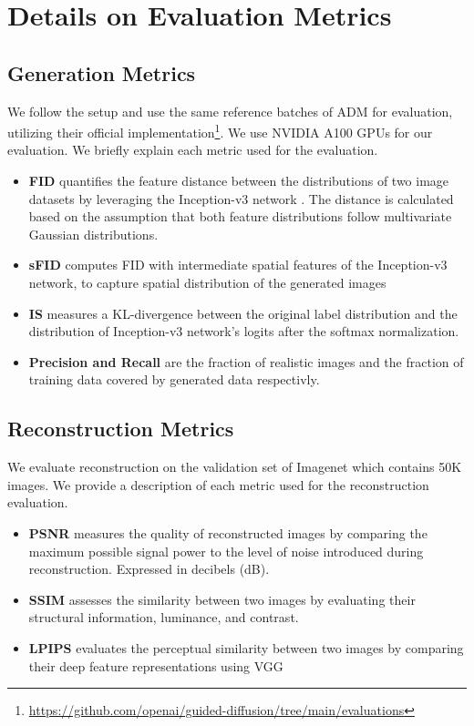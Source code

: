 \section{Details on Evaluation Metrics}
\label{sec:appendix_metrics}

\subsection{Generation Metrics}
We follow the setup and use the same reference batches of ADM \cite{nichol21a}
for evaluation, utilizing their official implementation\footnote{\url{https://github.com/openai/guided-diffusion/tree/main/evaluations}}. We use NVIDIA A100 GPUs for our evaluation.
 We briefly explain each metric used for the evaluation.

 \begin{itemize}
     \item \textbf{FID} \cite{fid} quantifies the feature distance between the distributions of two image datasets by leveraging the Inception-v3 network \cite{szegedy2016rethinking}. The distance is calculated based on the assumption that both feature distributions follow multivariate Gaussian distributions.
     \item \textbf{sFID} \cite{sfid} computes FID with intermediate spatial features of the
        Inception-v3 network, to capture spatial distribution of the generated images
     \item \textbf{IS} \cite{is}  measures a KL-divergence between the original label distribution and the
distribution of Inception-v3 network's logits after the softmax normalization.
\item \textbf{Precision and Recall} \cite{kynkaanniemi2019improved} are the
fraction of realistic images and the fraction of training data covered by generated data respectivly.
 \end{itemize}

\clearpage

\subsection{Reconstruction Metrics}
We evaluate reconstruction on the validation set of Imagenet which contains 50K images. We provide a description of each metric used for the reconstruction evaluation.

 \begin{itemize}
     \item \textbf{PSNR} measures the quality of reconstructed images by comparing the maximum possible signal power to the level of noise introduced during reconstruction. Expressed in decibels (dB).
     \item \textbf{SSIM} \cite{ssim} assesses the similarity between two images by evaluating their structural information, luminance, and contrast. 
     \item \textbf{LPIPS} \cite{zhang2018unreasonable}  evaluates the perceptual similarity between two images by comparing their deep feature representations using VGG \cite{vgg}
 \end{itemize}



